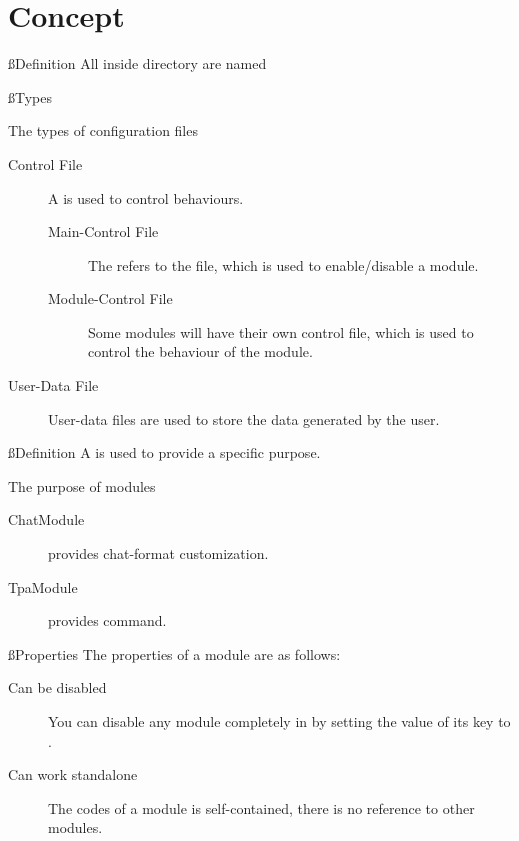 \chapter{Concept}\label{ch:concept}

\ss{Definition}
All  inside  directory are named 

\ss{Types}
\begin{note}{The types of configuration files}
    \begin{description}
        \item[Control File] {A  is used to control behaviours.}
        \begin{description}
            \item[Main-Control File] The  refers to the  file, which is used to enable/disable a module.
            \item[Module-Control File] Some modules will have their own control file, which is used to control the behaviour of the module.
        \end{description}

        \item[User-Data File] User-data files are used to store the data generated by the user.
    \end{description}
\end{note}


\clearpage
{}

\ss{Definition}
A  is used to provide a specific purpose.
\begin{example}{The purpose of modules}
    \begin{description}
        \item [ChatModule] provides chat-format customization.
        \item [TpaModule] provides  command.
    \end{description}
\end{example}

\ss{Properties}
The properties of a module are as follows:
\begin{description}
    \item [Can be disabled] You can disable any module completely in  by setting the value of its  key to .
    \item [Can work standalone] The codes of a module is self-contained, there is no reference to other modules.
\end{description}


